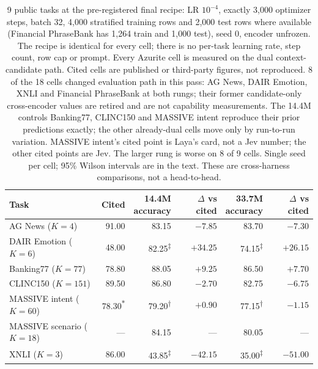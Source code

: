 \begin{table}[htbp]
\centering
\footnotesize
\caption{9 public tasks at the pre-registered final recipe: LR $10^{-4}$,
exactly 3{,}000 optimizer steps, batch 32, 4{,}000 stratified training rows and
2{,}000 test rows where available (Financial PhraseBank has 1{,}264 train and
1{,}000 test), seed 0, encoder unfrozen. The recipe is identical for every cell;
there is no per-task learning rate, step count, row cap or prompt. Every Azurite
cell is measured on the dual context-candidate path. Cited cells are published
or third-party figures, not reproduced. 8 of the 18
cells changed evaluation path in this pass: AG News, DAIR Emotion, XNLI and
Financial PhraseBank at both rungs; their former candidate-only cross-encoder
values are retired and are not capability measurements. The 14.4M controls
Banking77, CLINC150 and MASSIVE intent reproduce their prior predictions
exactly; the other already-dual cells move only by run-to-run
variation. MASSIVE intent's cited point is Laya's card, not a Jev number; the
other cited points are Jev. The larger rung is worse on 8 of
9 cells. Single seed per cell;
95\% Wilson intervals are in the text. These are cross-harness comparisons, not
a head-to-head.}
\label{tab:suite}
\setlength{\tabcolsep}{3pt}
\begin{tabular}{@{}lrrrrr@{}}
\toprule
Task & Cited & \shortstack{14.4M\\accuracy} & \shortstack{$\Delta$ vs\\cited} &
\shortstack{33.7M\\accuracy} & \shortstack{$\Delta$ vs\\cited} \\
\midrule
AG News ($K=4$) & 91.00 & 83.15 & $-7.85$ & 83.70 & $-7.30$ \\
DAIR Emotion ($K=6$) & 48.00 & 82.25\textsuperscript{\(\ddagger\)} & \textbf{$+34.25$} & 74.15\textsuperscript{\(\ddagger\)} & \textbf{$+26.15$} \\
Banking77 ($K=77$) & 78.80 & 88.05 & \textbf{$+9.25$} & 86.50 & \textbf{$+7.70$} \\
CLINC150 ($K=151$) & 89.50 & 86.80 & $-2.70$ & 82.75 & $-6.75$ \\
MASSIVE intent ($K=60$) & 78.30\textsuperscript{\(\ast\)} & 79.20\textsuperscript{\(\dagger\)} & $+0.90$ & 77.15\textsuperscript{\(\dagger\)} & $-1.15$ \\
MASSIVE scenario ($K=18$) & --- & 84.15 & --- & 80.05 & --- \\
XNLI ($K=3$) & 86.00 & 43.85\textsuperscript{\(\ddagger\)} & $-42.15$ & 35.00\textsuperscript{\(\ddagger\)} & $-51.00$ \\

\end{tabular}
\end{table}
